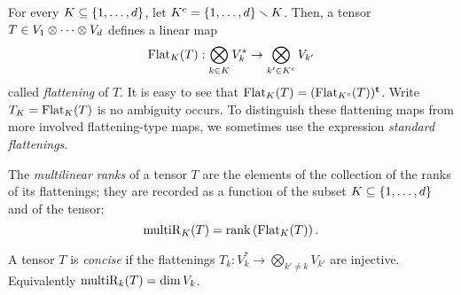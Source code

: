 \begin{definition}
\label{introduction-definition-flattenings}
For every $K \subseteq \{1 , \ldots , d\}$, let $K^c = \{1, \ldots , d\} \smallsetminus K$. Then, a tensor $T \in V_1 \otimes \cdots \otimes V_d$ defines a linear map 
\[
    \mathrm{Flat}_K(T): \bigotimes_{k \in K} V_{k}^* \to  \bigotimes_{k' \in K^c} V_{k'}
\]
called \emph{flattening} of $T$. It is easy to see that $\mathrm{Flat}_K(T) = (\mathrm{Flat}_{K^c}(T))^{\mathbf{t}}$. Write $T_K = \mathrm{Flat}_{K}(T)$ is no ambiguity occurs. To distinguish these flattening maps from more involved flattening-type maps, we sometimes use the expression \emph{standard flattenings}.

The {\it multilinear ranks} of a tensor $T$ are the elements of the collection of the ranks of its flattenings; they are recorded as a function of the subset $K \subseteq \{ 1 , \ldots , d\}$ and of the tensor:
\[
 \mathrm{multiR}_{K}(T) = \mathrm{rank} \left( \mathrm{Flat}_K(T) \right).
\]
\end{definition}

\begin{definition}
\label{introduction-definition-concise}
A tensor $T$ is \emph{concise} if the flattenings $T_k : V_k^* \to \bigotimes_{k' \neq k} V_{k'}$ are injective. Equivalently $\mathrm{multiR}_k(T) = \dim V_k$.
\end{definition}

